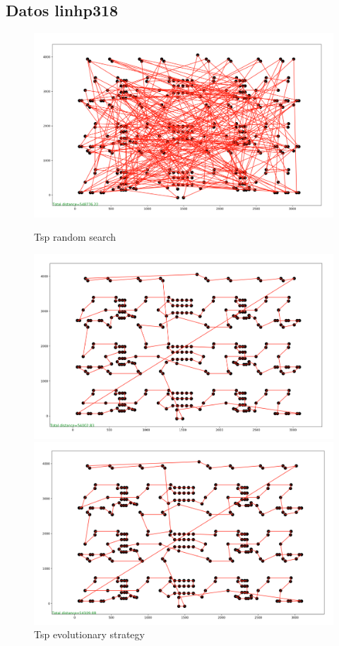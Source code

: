 \documentclass{article}
\begin{document}
\subsection{Datos linhp318}

\begin{figure}[H]
	\begin{minipage}{0.33\textwidth}
		\centering
		\includegraphics[width=1\textwidth]{../../image/randomsearch/linhp318.png}
		\caption{\label{fig:Figura1} Tsp random search}
	\end{minipage}\hfill
	\begin {minipage}{0.33\textwidth}
		\centering
		\includegraphics[width=1\textwidth]{../../image/evolutionarystrategy/linhp318.png}
		\caption{\label{fig:Figura1} Tsp evolutionary strategy}
	\end{minipage}
	\begin {minipage}{0.33\textwidth}
	\centering
	\includegraphics[width=1\textwidth]{../../image/simulatedannealing/linhp318.png}

\end{minipage}
\end{figure}
\end{document}
